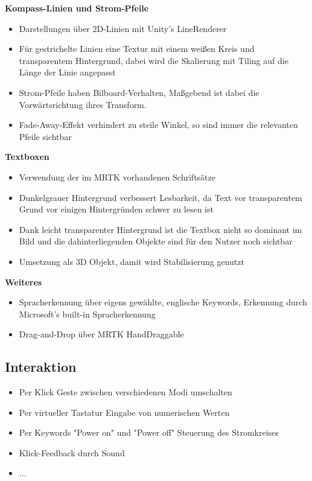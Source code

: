 \textbf{Kompass-Linien und Strom-Pfeile}
\begin{itemize}
	\item Darstellungen über 2D-Linien mit Unity's LineRenderer
	\item Für gestrichelte Linien eine Textur mit einem weißen Kreis und transparentem Hintergrund, dabei wird die Skalierung mit Tiling auf die Länge der Linie angepasst
	\item Strom-Pfeile haben Bilboard-Verhalten, Maßgebend ist dabei die Vorwärtsrichtung ihres Transform.
	\item Fade-Away-Effekt verhindert zu steile Winkel, so sind immer die relevanten Pfeile sichtbar
\end{itemize}

\textbf{Textboxen}
\begin{itemize}
	\item Verwendung der im MRTK vorhandenen Schriftsätze
	\item Dunkelgrauer Hintergrund verbessert Lesbarkeit, da Text vor transparentem Grund vor einigen Hintergründen schwer zu lesen ist
	\item Dank leicht transparenter Hintergrund ist die Textbox nicht so dominant im Bild und die dahinterliegenden Objekte sind für den Nutzer noch sichtbar
	\item Umsetzung als 3D Objekt, damit wird Stabilisierung genutzt
\end{itemize}

\textbf{Weiteres}
\begin{itemize}
	\item Spracherkennung über eigens gewählte, englische Keywords, Erkennung durch Microsoft's built-in Spracherkennung
	\item Drag-and-Drop über MRTK HandDraggable 
\end{itemize}

\subsection{Interaktion}
\begin{itemize}
	\item Per Klick Geste zwischen verschiedenen Modi umschalten
	\item Per virtueller Tastatur Eingabe von numerischen Werten
	\item Per Keywords "Power on" und "Power off" Steuerung des Stromkreises
	\item Klick-Feedback durch Sound
	\item ...
\end{itemize}

